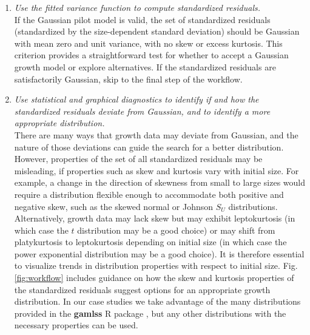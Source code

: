 \documentclass[11pt]{article}
\newcommand{\tom}[2]{{\color{red}{#1}}\footnote{\textit{\color{red}{#2}}}}
\begin{document}
{\begin{enumerate}
Allowing non-constant variance means that it is not necessary to transform the data in a way that stabilizes the growth variance. 
Transformation remains an option when it does not create new problems (\tom{discussed later}{I think we will need to talk about the beta regression approach in the Discussion, and that could be a place to give an example of `new problems'.}), and it may have advantages besides variance stabilization.
In particular log-transformation is often appropriate for size data \citep{ellner-etal-2016}, and it helps avoid eviction at small sizes. 

\item \textit{Use the fitted variance function to compute standardized residuals.}
\\
If the Gaussian pilot model is valid, the set of standardized residuals (standardized by the size-dependent standard deviation) should be Gaussian with mean zero and unit variance, with no skew or excess kurtosis. 
This criterion provides a straightforward test for whether to accept a Gaussian growth model or explore alternatives. 
If the standardized residuals are satisfactorily Gaussian, skip to the final step of the workflow. 

\item \textit{Use statistical and graphical diagnostics to identify if and how the standardized residuals deviate from Gaussian, and to identify a more appropriate distribution.}
\\
There are many ways that growth data may deviate from Gaussian, and the nature of those deviations can guide the search for a better distribution. 
However, properties of the set of all standardized residuals may be misleading, if properties such as skew and kurtosis vary with initial size. 
For example, a change in the direction of skewness from small to large sizes would require a distribution flexible enough to accommodate both positive and negative skew, such as the skewed normal or Johnson $S_{U}$ distributions. 
Alternatively, growth data may lack skew but may exhibit leptokurtosis (in which case the $t$ distribution may be a good choice) or may shift from platykurtosis to leptokurtosis depending on initial size (in which case the power exponential distribution may be a good choice). 
It is therefore essential to visualize trends in distribution properties with respect to initial size. 
Fig. \ref{fig:workflow} includes guidance on how the skew and kurtosis properties of the standardized residuals suggest options for 
an appropriate growth distribution. In our case studies we take advantage of the many distributions provided in the \textbf{gamlss} R package \citep{stasinopoulos2007generalized}, but any other distributions with the necessary properties can be used.  


\end{enumerate}}
\end{document}
